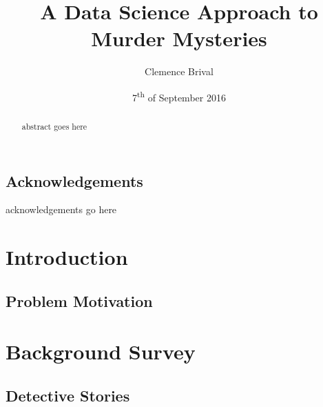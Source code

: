 \documentclass{mproj}
\begin{document}
\title{A Data Science Approach to Murder Mysteries}
\author{Clemence Brival}
\date{7\textsuperscript{th} of September 2016}
\maketitle

\begin{abstract}
abstract goes here
\end{abstract}

\educationalconsent


\newpage
\section*{Acknowledgements}

acknowledgements go here


\tableofcontents


\chapter{Introduction}\label{intro}

\section{Problem Motivation}


\chapter{Background Survey}\label{survey}


\section{Detective Stories}
\end{document}
